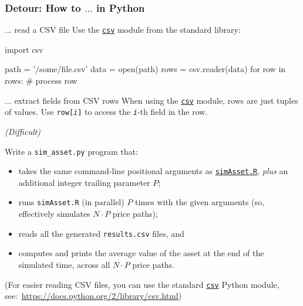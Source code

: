 \documentclass[english,serif,mathserif,xcolor=pdftex,dvipsnames,table]{beamer}
\begin{document}
\begin{frame}[fragile]
  \frametitle{Detour: How to $\ldots$ in Python}
  \small{}

  \begin{describe}{$\ldots$ read a CSV file}
    Use the \href{https://docs.python.org/2/library/csv.html}{\texttt{csv}}
    module from the standard library:
    \begin{python}
import csv

path = '/some/file.csv'
data = open(path)
rows = csv.reader(data)
for row in rows:
  # process row
    \end{python}
  \end{describe}

  \begin{describe}{$\ldots$ extract fields from CSV rows}
    When using the \href{https://docs.python.org/2/library/csv.html}{\texttt{csv}}
    module, rows are just tuples of values.  Use \texttt{row[\emph{i}]} to
    access the \texttt{\emph{i}}-th field in the row.
  \end{describe}
\end{frame}


\begin{frame}[fragile]
  \begin{exercise*}[6.D] \emph{(Difficult)}

    \+
    Write a \texttt{sim\_asset.py} program that:
    \begin{itemize}
    \item takes the same command-line positional arguments as
      \href{https://github.com/uzh/gc3pie/blob/master/docs/programmers/tutorials/workflows/downloads/simAsset.R}{\texttt{simAsset.R}},
      \emph{plus} an additional integer trailing parameter $P$;
    \item runs \texttt{simAsset.R} (in parallel) $P$ times with the given arguments (so, effectively simulates $N \cdot P$ price paths);
    \item reads all the generated \texttt{results.csv} files, and
    \item computes and prints the average value of the asset at the end of the simulated time, across all $N \cdot P$ price paths.
    \end{itemize}

    \+ {\footnotesize (For easier reading CSV files, you can use the standard
      \href{https://docs.python.org/2/library/csv.html}{\texttt{csv}}
      Python module,
      see:~\url{https://docs.python.org/2/library/csv.html})}
  \end{exercise*}
\end{frame}
\end{document}

